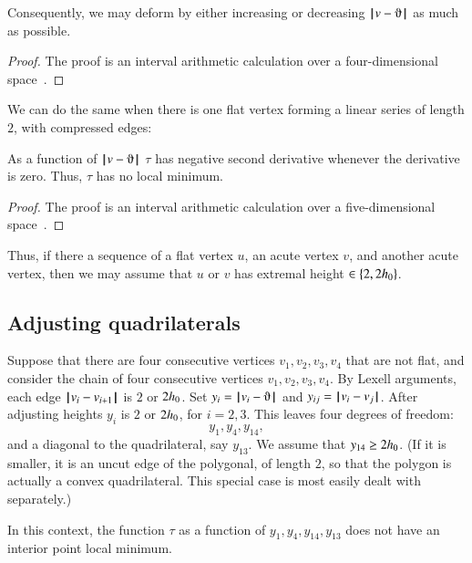 Consequently, we may deform by either increasing or decreasing $\norm{v}{\orgn}$ as much as possible.  

\begin{proof}
The proof is an interval arithmetic calculation over a four-dimensional space~\cite[cc:d2a]{hales:2009:nonlinear}.  %
\end{proof}


We can do the same when there is one flat vertex forming a linear series of length $2$, with compressed edges:

\begin{lemma}
As a function of $\norm{v}{\orgn}$
 $\tau$ has negative second derivative whenever the derivative is zero.  Thus, $\tau$ has no local minimum.
\end{lemma}

\begin{proof}
The proof is an interval arithmetic calculation over a five-dimensional space~\cite[cc:d2b]{hales:2009:nonlinear}. %
\end{proof}


Thus, if there a sequence of a flat vertex $u$, an acute vertex $v$, and another acute vertex, then we may assume that $u$ or $v$ has extremal height $\in\{2,2{h_0}\}$.



\subsection{Adjusting quadrilaterals}

Suppose that there are four consecutive vertices $v_1,v_2,v_3,v_4$ that are not flat, and consider the chain of four consecutive vertices $v_1,v_2,v_3,v_4$. By Lexell arguments, each edge ${\hskip0.1em|\hskip-0.15em|\hskip0.1em}v_i - v_{i+1}{\hskip0.1em|\hskip-0.15em|\hskip0.1em}$ is $2$ or $2{h_0}$. Set $y_i = \norm{v_i}{\orgn}$ and $y_{ij} = {\hskip0.1em|\hskip-0.15em|\hskip0.1em}v_i - v_j{\hskip0.1em|\hskip-0.15em|\hskip0.1em}$. After adjusting heights $y_i$ is $2$ or $2{h_0}$, for $i=2,3$. This leaves four degrees of freedom:
$$
y_1,y_4,y_{14},
$$
and a diagonal to the quadrilateral, say $y_{13}$. We assume that  $y_{14}\ge 2{h_0}$.  (If it is smaller, it is an uncut edge of the polygonal, of length $2$, so that the polygon is actually a convex quadrilateral.  This special case is most easily dealt with separately.)

\begin{lemma}
In this context, the function $\tau$ as a function of $y_1,y_4,y_{14},y_{13}$ does not have an interior point local minimum.
\end{lemma}

